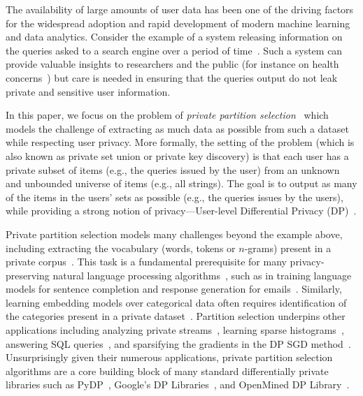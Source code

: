 

The availability of large amounts of user data has been one of the driving factors for the widespread adoption and rapid development of modern machine learning and data analytics. 
Consider the example of a system releasing information on the queries asked to a search engine over a period of time~\cite{korolova2009releasing, bavadekar2021google}. Such a system can provide valuable insights to researchers and the public (for instance on health concerns~\cite{bavadekar2021google}) but care is needed in ensuring that the queries output do not leak private and sensitive user information.

In this paper, we focus on the problem of {\it private partition selection}~\cite{desfontaines2022dppartition,gopi2020dpunion} which models the challenge of  extracting as much data as possible from such a dataset while respecting user privacy. 
More formally, the setting of the problem  (which is also known as private set union or private key discovery) is that each user has a private subset of items (e.g., the queries issued by the user) from an unknown and unbounded universe of items (e.g., all strings). The goal is to output as many of the items in the users' sets as possible (e.g., the queries issues by the users), while  providing a strong notion of privacy---User-level Differential Privacy (DP)~\cite{dwork2014book}.


Private partition selection models many challenges beyond the example above, including extracting the vocabulary (words, tokens or $n$-grams) present in a private corpus~\cite{zhang2022federated,kim2021differentially}. This task is a fundamental prerequisite for many privacy-preserving natural language processing algorithms~\cite{wilson2019differentially,gopi2020dpunion}, such as in training language models for sentence completion and response generation for emails~\cite{kim2021differentially}. Similarly,  learning embedding models over categorical data often requires identification of the categories present in a private dataset~\cite{ghazi2023sparsitypreserving, ghazi2024dpsparsegrad}. Partition selection underpins other applications including analyzing private streams~\cite{cardoso2022differentially,zhang2023differentially}, learning sparse histograms~\cite{boneh2021lightweight}, answering SQL queries~\cite{desfontaines2022dppartition}, and sparsifying the gradients in the DP SGD method~\cite{ghazi2023sparsitypreserving}.
Unsurprisingly given their numerous applications, private partition selection algorithms \cite{korolova2009releasing} are a core building block of many standard differentially private libraries such as PyDP~\cite{pydp_partition}, Google's DP Libraries~\cite{googledplibrary,amin2022plume}, and OpenMined DP Library~\cite{openmined}. 

